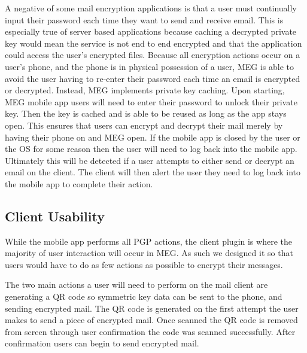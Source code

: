 \documentclass[11pt]{article}
\begin{document}
\par A negative of some mail encryption applications is that a user must continually input their password each time they want to send and receive email. This is especially true of server based applications because caching a decrypted private key would mean the service is not end to end encrypted and that the application could access the user's encrypted files. Because all encryption actions occur on a user's phone, and the phone is in physical possession of a user, MEG is able to avoid the user having to re-enter their password each time an email is encrypted or decrypted. Instead, MEG implements private key caching. Upon starting, MEG mobile app users will need to enter their password to unlock their private key. Then the key is cached and is able to be reused as long as the app stays open. This ensures that users can encrypt and decrypt their mail merely by having their phone on and MEG open. If the mobile app is closed by the user or the OS for some reason then the user will need to log back into the mobile app. Ultimately this will be detected if a user attempts to either send or decrypt an email on the client. The client will then alert the user they need to log back into the mobile app to complete their action.
\subsection{Client Usability}
\par While the mobile app performs all PGP actions, the client plugin is where the majority of user interaction will occur in MEG. As such we designed it so that users would have to do as few actions as possible to encrypt their messages.
\par The two main actions a user will need to perform on the mail client are generating a QR code so symmetric key data can be sent to the phone, and sending encrypted mail. The QR code is generated on the first attempt the user makes to send a piece of encrypted mail. Once scanned the QR code is removed from screen through user confirmation the code was scanned successfully. After confirmation users can begin to send encrypted mail.
\end{document}
